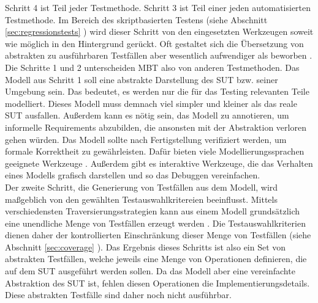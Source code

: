 Schritt 4 ist Teil jeder Testmethode. Schritt 3 ist Teil einer jeden automatisierten Testmethode. Im Bereich des skriptbasierten Testens (siehe Abschnitt \ref{sec:regressionstests} ) wird dieser Schritt von den eingesetzten Werkzeugen soweit wie möglich in den Hintergrund gerückt. Oft gestaltet sich die Übersetzung von abstrakten zu ausführbaren Testfällen aber wesentlich aufwendiger als beworben \cite{graham_experiences_2012}.\\
Die Schritte 1 und 2 unterscheiden \Gls{MBT} also von anderen Testmethoden. Das Modell aus Schritt 1 soll eine abstrakte Darstellung des \Gls{SUT} bzw. seiner Umgebung sein. Das bedeutet, es werden nur die für das Testing relevanten Teile modelliert. Dieses Modell muss demnach viel simpler und kleiner als das reale \Gls{SUT} ausfallen. Außerdem kann es nötig sein, das Modell zu annotieren, um informelle Requirements abzubilden, die ansonsten mit der Abstraktion verloren gehen würden. Das Modell sollte nach Fertigstellung verifiziert werden, um formale Korrektheit zu gewährleisten. Dafür bieten viele Modellierungssprachen geeignete Werkzeuge \cite{kaneiwa_consistency_2006}. Außerdem gibt es interaktive Werkzeuge, die das Verhalten eines Modells grafisch darstellen und so das Debuggen vereinfachen.\\
Der zweite Schritt, die Generierung von Testfällen aus dem Modell, wird maßgeblich von den gewählten Testauswahlkritereien beeinflusst. Mittels verschiedensten Traversierungsstrategien kann aus einem Modell grundsätzlich eine unendliche Menge von Testfällen erzeugt werden \cite{utting_practical_2007}. Die Testauswahlkriterien dienen daher der kontrollierten Einschränkung dieser Menge von Testfällen (siehe Abschnitt \ref{sec:coverage} ). Das Ergebnis dieses Schritts ist also ein Set von abstrakten Testfällen, welche jeweils eine Menge von Operationen definieren, die auf dem \Gls{SUT} ausgeführt werden sollen. Da das Modell aber eine vereinfachte Abstraktion des \Gls{SUT} ist, fehlen diesen Operationen die Implementierungsdetails. Diese abstrakten Testfälle sind daher noch nicht ausführbar.\\
